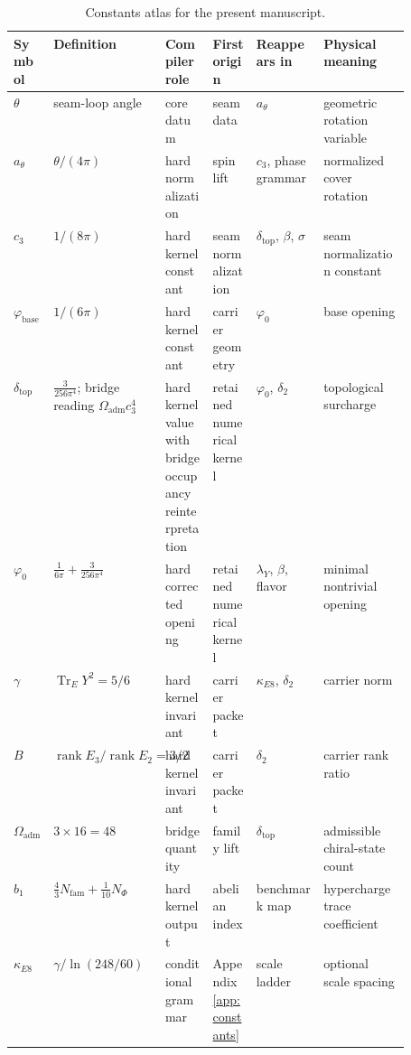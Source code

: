 \documentclass[11pt,a4paper]{article}
\theoremstyle{definition}
\theoremstyle{remark}
\DeclareMathOperator{\tr}{Tr}
\DeclareMathOperator{\rank}{rank}
\newcommand{\cthree}{c_3}
\newcommand{\atheta}{a_\theta}
\newcommand{\phibase}{\varphi_{\mathrm{base}}}
\newcommand{\phiz}{\varphi_0}
\newcommand{\deltatop}{\delta_{\mathrm{top}}}
\newcommand{\bone}{b_1}
\newcommand{\Oadm}{\Omega_{\mathrm{adm}}}
\newcommand{\lambdaY}{\lambda_Y}
\begin{document}
\begin{table}[t]
\centering
\scriptsize
\setlength{\tabcolsep}{3pt}
\begin{tabularx}{\linewidth}{@{}>{\raggedright\arraybackslash}p{0.10\linewidth}>{\raggedright\arraybackslash}p{0.18\linewidth}>{\raggedright\arraybackslash}p{0.12\linewidth}>{\raggedright\arraybackslash}p{0.11\linewidth}YY@{}}
\toprule
Symbol & Definition & Compiler role & First origin & Reappears in & Physical meaning \\
\midrule
$\theta$ & seam-loop angle & core datum & seam data & $\atheta$ & geometric rotation variable \\
$\atheta$ & $\theta/(4\pi)$ & hard normalization & spin lift & $\cthree$, phase grammar & normalized cover rotation \\
$\cthree$ & $1/(8\pi)$ & hard kernel constant & seam normalization & $\deltatop$, $\beta$, $\sigma$ & seam normalization constant \\
$\phibase$ & $1/(6\pi)$ & hard kernel constant & carrier geometry & $\phiz$ & base opening \\
$\deltatop$ & $\frac{3}{256\pi^4}$; bridge reading $\Oadm\cthree^4$ & hard kernel value with bridge occupancy reinterpretation & retained numerical kernel & $\phiz$, $\delta_2$ & topological surcharge \\
$\phiz$ & $\frac{1}{6\pi}+\frac{3}{256\pi^4}$ & hard corrected opening & retained numerical kernel & $\lambdaY$, $\beta$, flavor & minimal nontrivial opening \\
$\gamma$ & $\tr_EY^2=5/6$ & hard kernel invariant & carrier packet & $\kappa_{E8}$, $\delta_2$ & carrier norm \\
$B$ & $\rank E_3/\rank E_2=3/2$ & hard kernel invariant & carrier packet & $\delta_2$ & carrier rank ratio \\
$\Oadm$ & $3\times16=48$ & bridge quantity & family lift & $\deltatop$ & admissible chiral-state count \\
$\bone$ & $\frac43N_{\mathrm{fam}}+\frac1{10}N_\Phi$ & hard kernel output & abelian index & benchmark map & hypercharge trace coefficient \\
$\kappa_{E8}$ & $\gamma/\ln(248/60)$ & conditional grammar & Appendix~\ref{app:constants} & scale ladder & optional scale spacing \\
\bottomrule
\end{tabularx}
\caption{Constants atlas for the present manuscript.}
\label{tab:constants-atlas}
\end{table}
\end{document}
